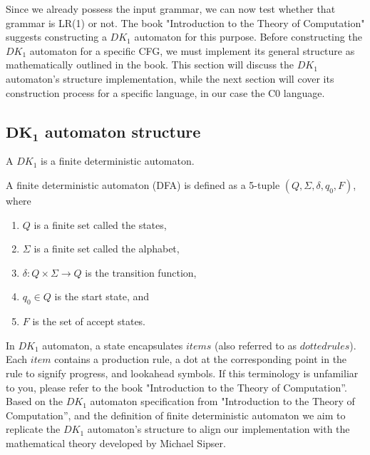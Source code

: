 Since we already possess the input grammar, we can now test whether that grammar is LR(1) or not. The book "Introduction to the Theory of Computation" suggests constructing a \( DK_{1} \) automaton for this purpose. Before constructing the \( DK_{1} \) automaton for a specific CFG, we must implement its general structure as mathematically outlined in the book. This section will discuss the \( DK_{1} \) automaton’s structure implementation, while the next section will cover its construction process for a specific language, in our case the C0 language.

\vspace{20pt}

\subsection*{\(\boldsymbol{DK_{1}}\) automaton structure}


A \( DK_{1} \) is a finite deterministic automaton.

\begin{definition}[2.0]
    A finite deterministic automaton (DFA) is defined as a 5-tuple  \((Q, \Sigma, \delta, q_{0}, F)\), where
    \begin{enumerate}
        \item \(Q\) is a finite set called the states,
        \item \(\Sigma\) is a finite set called the alphabet,
        \item \(\delta : Q \times \Sigma \to Q\) is the transition function,
        \item \(q_{0} \in Q\) is the start state, and
        \item \(F\) is the set of accept states.
    \end{enumerate}
\end{definition}
\setlength{\parindent}{0pt}

In \( DK_{1} \) automaton, a state encapsulates \(items\) (also referred to as \(dotted rules\)). Each \(item\) contains a production rule, a dot at the corresponding point in the rule to signify progress, and lookahead symbols. If this terminology is unfamiliar to you, please refer to the book "Introduction to the Theory of Computation”.\\

Based on the \( DK_{1} \) automaton specification from "Introduction to the Theory of Computation”, and the definition of finite deterministic automaton we aim to replicate the \( DK_{1} \) automaton's structure to align our implementation with the mathematical theory developed by Michael Sipser.

